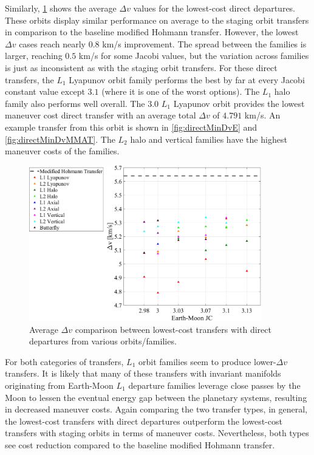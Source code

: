 Similarly, \cref{fig:compareDeltavDirect} shows the average $\Delta v$ values for the lowest-cost
direct departures. These orbits display similar performance on average to the staging orbit
transfers in comparison to the baseline modified Hohmann transfer. However, the lowest $\Delta v$
cases reach nearly $0.8$ km/s improvement. The spread between the families is larger, reaching
$0.5$ km/s for some Jacobi values, but the variation across families is just as inconsistent as
with the staging orbit transfers. For these direct transfers, the $L_{1}$ Lyapunov orbit family
performs the best by far at every Jacobi constant value except $3.1$ (where it is one of the worst
options). The $L_{1}$ halo family also performs well overall. The $3.0$ $L_{1}$ Lyapunov orbit
provides the lowest maneuver cost direct transfer with an average total $\Delta v$ of $4.791$ km/s.
An example transfer from this orbit is shown in \cref{fig:directMinDvE} and
\cref{fig:directMinDvMMAT}. The $L_{2}$ halo and vertical families have the highest maneuver costs
of the families.

\begin{figure}[!htb]
    \centering
    \includegraphics[width=0.9\textwidth]{figures/DeltavComparisonDirect.pdf}
    \caption{Average $\Delta v$ comparison between lowest-cost transfers with direct departures from various orbits/families.}
    \label{fig:compareDeltavDirect}
\end{figure}

For both categories of transfers, $L_{1}$ orbit families seem to produce lower-$\Delta v$
transfers. It is likely that many of these transfers with invariant manifolds originating from
Earth-Moon $L_{1}$ departure families leverage close passes by the Moon to lessen the eventual
energy gap between the planetary systems, resulting in decreased maneuver costs. Again comparing
the two transfer types, in general, the lowest-cost transfers with direct departures outperform the
lowest-cost transfers with staging orbits in terms of maneuver costs. Nevertheless, both types see
cost reduction compared to the baseline modified Hohmann transfer.

